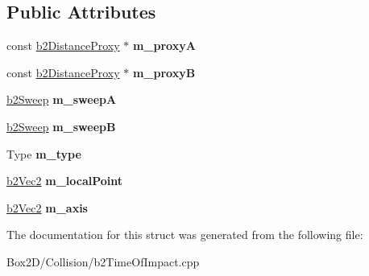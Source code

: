 \subsection*{Public Attributes}
\begin{DoxyCompactItemize}
\item 
\mbox{\label{structb2_separation_function_a5c03d798e97cd653aa7db390275bf9a7}} 
const \hyperlink{structb2_distance_proxy}{b2\+Distance\+Proxy} $\ast$ {\bfseries m\+\_\+proxyA}
\item 
\mbox{\label{structb2_separation_function_a25fc938e03bf77ac276b17b24e52958f}} 
const \hyperlink{structb2_distance_proxy}{b2\+Distance\+Proxy} $\ast$ {\bfseries m\+\_\+proxyB}
\item 
\mbox{\label{structb2_separation_function_a46b838a661baa40cde771b779c2ff341}} 
\hyperlink{structb2_sweep}{b2\+Sweep} {\bfseries m\+\_\+sweepA}
\item 
\mbox{\label{structb2_separation_function_a11ba433f6e524fb92390bd8b4dd376b6}} 
\hyperlink{structb2_sweep}{b2\+Sweep} {\bfseries m\+\_\+sweepB}
\item 
\mbox{\label{structb2_separation_function_a51075eff2de404a1d82eee831fdfd4af}} 
Type {\bfseries m\+\_\+type}
\item 
\mbox{\label{structb2_separation_function_ab77a17de0f5c708212090f599ec1795e}} 
\hyperlink{structb2_vec2}{b2\+Vec2} {\bfseries m\+\_\+local\+Point}
\item 
\mbox{\label{structb2_separation_function_a767b8fc4174d200ae8fb1d2bfba3407b}} 
\hyperlink{structb2_vec2}{b2\+Vec2} {\bfseries m\+\_\+axis}
\end{DoxyCompactItemize}


The documentation for this struct was generated from the following file\+:\begin{DoxyCompactItemize}
\item 
Box2\+D/\+Collision/b2\+Time\+Of\+Impact.\+cpp\end{DoxyCompactItemize}
